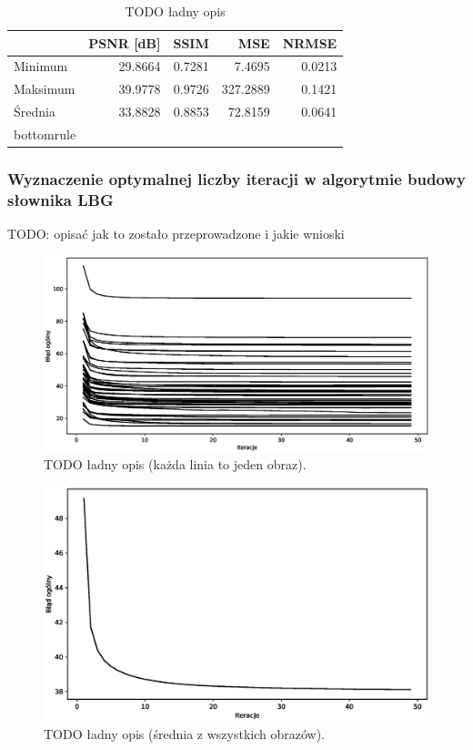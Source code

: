 \documentclass{article}
\begin{document}
\begin{table}[H]
\centering
\begin{tabular}{@{}lrrrr@{}}
         & PSNR {[}dB{]} & SSIM  & MSE     & NRMSE \\ \midrule
Minimum  & 29.8664       & 0.7281 & 7.4695   & 0.0213 \\
Maksimum & 39.9778       & 0.9726 & 327.2889 & 0.1421 \\
Średnia  & 33.8828       & 0.8853 & 72.8159  & 0.0641 \\ bottomrule
\end{tabular}
\caption{TODO ładny opis}
\label{tab:lbg_summary}
\end{table}

\subsubsection{Wyznaczenie optymalnej liczby iteracji w algorytmie budowy słownika LBG}

TODO: opisać jak to zostało przeprowadzone i jakie wnioski

\begin{figure}[H]
\centering
  \centering
  \includegraphics[width=.9\linewidth]{images/lbg_4x4_32_50_iterations.eps}  
  \caption{TODO ładny opis (każda linia to jeden obraz).}
  \label{fig:lbg_iterations}
\end{figure}

\begin{figure}[H]
  \centering
  \includegraphics[width=.9\linewidth]{images/lbg_4x4_32_mean_iterations.eps}  
  \caption{TODO ładny opis (średnia z wszystkich obrazów).}
  \label{fig:lbg_iterations_mean}
\end{figure}
\end{document}
